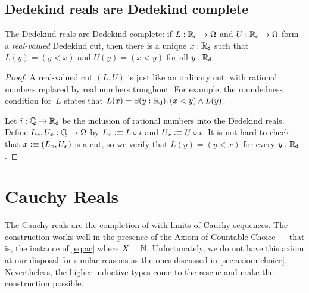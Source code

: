 \subsection{Dedekind reals are Dedekind complete}
\label{sec:RD-dedekind-complete}



\begin{thm} \label{RD-dedekind-complete} The Dedekind reals are Dedekind complete: if $L :
  \mathbb{R}_\mathsf{d} \to \Omega$ and $U : \mathbb{R}_\mathsf{d} \to \Omega$ form a \emph{real-valued} Dedekind cut, then
  there is a unique $x : \mathbb{R}_\mathsf{d}$ such that $L(y) = (y < x)$ and $U(y) = (x < y)$ for all $y :
  \mathbb{R}_\mathsf{d}$.
\end{thm}

\begin{proof}
  A real-valued cut $(L, U)$ is just like an ordinary cut, with rational numbers replaced
  by real numbers troughout. For example, the roundedness condition for~$L$ states that
  $L(x) = \exis{y : \RD} (x < y) \land L(y)$.

  Let $i : \mathbb{Q} \to \mathbb{R}_\mathsf{d}$ be the inclusion of rational numbers into the Dedekind reals.
  Define $L_x, U_x : \mathbb{Q} \to \Omega$ by $L_x \vcentcolon\equiv L \circ i$ and $U_x \vcentcolon\equiv U \circ i$.
  It is not hard to check that $x \vcentcolon\equiv (L_x, U_x)$ is a cut, so we verify that $L(y) =
  (y < x)$ for every $y : \mathbb{R}_\mathsf{d}$.
\end{proof}



\section{Cauchy Reals}
\label{sec:cauchy-reals}

The Cauchy reals are the completion of \Q with limits of Cauchy sequences. The
construction works well in the presence of the Axiom of Countable Choice --- 
that is, the instance of \autoref{eq:ac} where $X=\mathbb{N}$. 
Unfortunately, we do not have this axiom at our disposal for similar reasons as the ones discussed in
\autoref{sec:axiom-choice}. Nevertheless, the higher inductive types come to the rescue
and make the construction possible.

